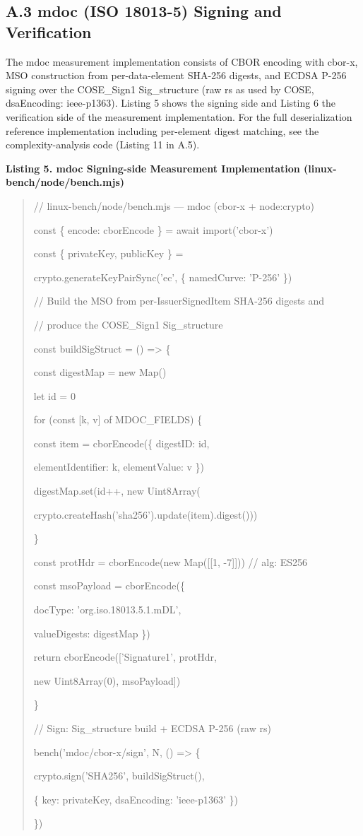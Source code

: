 \documentclass[conference]{IEEEtran}
\begin{document}
\subsection*{A.3 mdoc (ISO 18013-5) Signing and Verification}

The mdoc measurement implementation consists of CBOR encoding with cbor-x, MSO construction from per-data-element SHA-256 digests, and ECDSA P-256 signing over the COSE\_Sign1 Sig\_structure (raw r\textbar\textbar s as used by COSE, dsaEncoding: ieee-p1363). Listing 5 shows the signing side and Listing 6 the verification side of the measurement implementation. For the full deserialization reference implementation including per-element digest matching, see the complexity-analysis code (Listing 11 in A.5).

\textbf{Listing 5. mdoc Signing-side Measurement Implementation (linux-bench/node/bench.mjs)}

\begin{quote}
// linux-bench/node/bench.mjs --- mdoc (cbor-x + node:crypto)

const \{ encode: cborEncode \} = await import('cbor-x')

const \{ privateKey, publicKey \} =

crypto.generateKeyPairSync('ec', \{ namedCurve: 'P-256' \})

// Build the MSO from per-IssuerSignedItem SHA-256 digests and

// produce the COSE\_Sign1 Sig\_structure

const buildSigStruct = () =\textgreater{} \{

const digestMap = new Map()

let id = 0

for (const {[}k, v{]} of MDOC\_FIELDS) \{

const item = cborEncode(\{ digestID: id,

elementIdentifier: k, elementValue: v \})

digestMap.set(id++, new Uint8Array(

crypto.createHash('sha256').update(item).digest()))

\}

const protHdr = cborEncode(new Map({[}{[}1, -7{]}{]})) // alg: ES256

const msoPayload = cborEncode(\{

docType: 'org.iso.18013.5.1.mDL',

valueDigests: digestMap \})

return cborEncode({[}'Signature1', protHdr,

new Uint8Array(0), msoPayload{]})

\}

// Sign: Sig\_structure build + ECDSA P-256 (raw r\textbar\textbar s)

bench('mdoc/cbor-x/sign', N, () =\textgreater{} \{

crypto.sign('SHA256', buildSigStruct(),

\{ key: privateKey, dsaEncoding: 'ieee-p1363' \})

\})
\end{quote}
\end{document}
